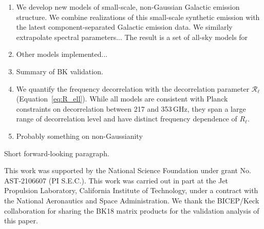 \documentclass[twocolumn]{aastex631}
\begin{document}
\begin{enumerate}
    \item We develop new models of small-scale, non-Gaussian Galactic emission structure. We combine realizations of this small-scale synthetic emission with the latest component-separated Galactic emission data. We similarly extrapolate spectral parameters... The result is a set of all-sky models for   %
    \item Other models implemented...
    \item Summary of BK validation.
    \item We quantify the frequency decorrelation with the decorrelation parameter $\mathcal{R}_\ell$ (Equation~\eqref{eq:R_ell}). While all models are consistent with Planck constraints on decorrelation between 217 and 353\,GHz, they span a large range of decorrelation level and have distinct frequency dependence of $R_\ell$.
    \item Probably something on non-Gaussianity
    
\end{enumerate}

Short forward-looking paragraph.

\begin{acknowledgments}

This work was supported by the National Science Foundation under grant No. AST-2106607 (PI S.E.C.). This work was carried out in part at the Jet Propulsion Laboratory, California Institute of Technology, under a contract with the National Aeronautics and Space Administration. We thank the BICEP/Keck collaboration for sharing the BK18 matrix products for the validation analysis of this paper. 

\end{acknowledgments}


\end{document}
